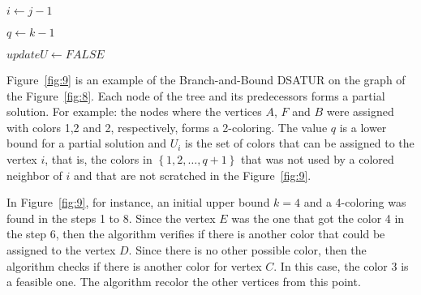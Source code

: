\documentclass[fleqn,10pt]{SelfArx} %
\newcommand{\chaves}[1] {\ensuremath{{\left \{ {#1} \right \}}}}
\begin{document}
\begin{footnotesize}
\begin{algorithm}[htpb]
{{{{							$i \gets j-1$
							
							$q \gets k-1$
							
							$updateU \gets FALSE$
							
						}
					}
				}
			}
			\Return{A function $c:V(G) \rightarrow \chaves{1, \ldots,k}$}
			\caption{$\textsc{Brown(G)}$}\label{alg:brown}
		\end{algorithm}
	\end{footnotesize}
	
	Figure~\ref{fig:9} is an example of the Branch-and-Bound \textsf{DSATUR} on the
	graph of the Figure~\ref{fig:8}. Each node of the tree and its
	predecessors forms a partial solution. For example: the nodes where
	the vertices $A$, $F$ and $B$ were assigned with colors 1,2 and 2,
	respectively, forms a 2-coloring. The value $q$ is a lower bound for a
	partial solution and $U_i$ is the set of colors that can be
	assigned to the vertex $i$, that is, the colors in $\chaves{1,2, \ldots,q+1}$
	that was not used by a colored neighbor of $i$ and that are not
	scratched in the Figure~\ref{fig:9}.
	
	In Figure~\ref{fig:9}, for instance, an initial upper bound $k =
	4$ and a 4-coloring was found in the steps 1 to 8. Since the vertex
	$E$ was the one that got the color 4 in the step 6, then the algorithm
	verifies if there is another color that could be assigned to the
	vertex $D$. Since there is no other possible color, then the algorithm
	checks if there is another color for vertex $C$. In this case, the
	color 3 is a feasible one. The algorithm recolor the other vertices
	from this point.
	
\end{document}
